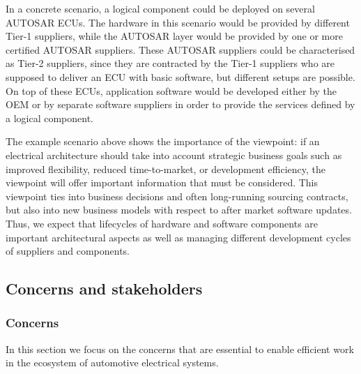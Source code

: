 In a concrete scenario, a logical component could be deployed on several AUTOSAR ECUs.
The hardware in this scenario would be provided by different Tier-1 suppliers, while the AUTOSAR layer would be provided by one or more certified AUTOSAR suppliers.
These AUTOSAR suppliers could be characterised as Tier-2 suppliers, since they are contracted by the Tier-1 suppliers who are supposed to deliver an ECU with basic software, but different setups are possible. 
On top of these ECUs, application software would be developed either by the OEM or by separate software suppliers in order to provide the services defined by a logical component. 

The example scenario above shows the importance of the  viewpoint: if an electrical architecture should take into account strategic business goals such as improved flexibility, reduced time-to-market, or development efficiency, the  viewpoint will offer important information that must be considered.
This viewpoint ties into business decisions and often long-running sourcing contracts, but also into new business models with respect to after market software updates.
Thus, we expect that lifecycles of hardware and software components are important architectural aspects as well as managing different development cycles of suppliers and components.


\subsection{Concerns and stakeholders} 


\subsubsection{Concerns}\label{vp:concerns}
In this section we focus on the concerns that are essential to enable efficient work in the ecosystem of automotive electrical systems. 

